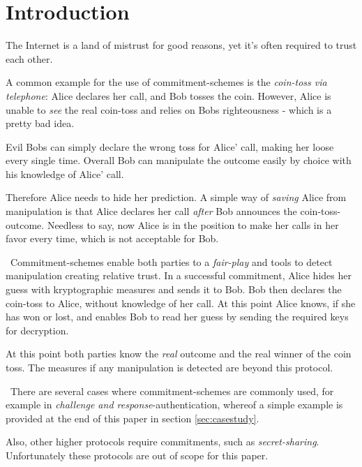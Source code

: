 \section{Introduction}
The Internet is a land of mistrust for good reasons, yet it's often required to trust each other. 

A common example for the use of commitment-schemes is the \textit{coin-toss via telephone}: Alice declares her call, and Bob tosses the coin. However, Alice is unable to \textit{see} the real coin-toss and relies on Bobs righteousness - which is a pretty bad idea. 

Evil Bobs can simply declare the wrong toss for Alice' call, making her loose every single time. Overall Bob can manipulate the outcome easily by choice with his knowledge of Alice' call. 

Therefore Alice needs to hide her prediction. A simple way of \textit{saving} Alice from manipulation is that Alice declares her call \textit{after} Bob announces the coin-toss-outcome. Needless to say, now Alice is in the position to make her calls in her favor every time, which is not acceptable for Bob. 

~\newline Commitment-schemes enable both parties to a \textit{fair-play} and tools to detect manipulation creating relative trust. In a successful commitment, Alice hides her guess with kryptographic measures and sends it to Bob. Bob then declares the coin-toss to Alice, without knowledge of her call. At this point Alice knows, if she has won or lost, and enables Bob to read her guess by sending the required keys for decryption.

At this point both parties know the \textit{real} outcome and the real winner of the coin toss. The measures if any manipulation is detected are beyond this protocol.

~\newline There are several cases where commitment-schemes are commonly used, for example in \textit{challenge and response}-authentication, whereof a simple example is provided at the end of this paper in section \ref{sec:casestudy}.

Also, other higher protocols require commitments, such as \textit{secret-sharing}. Unfortunately these protocols are out of scope for this paper. 

